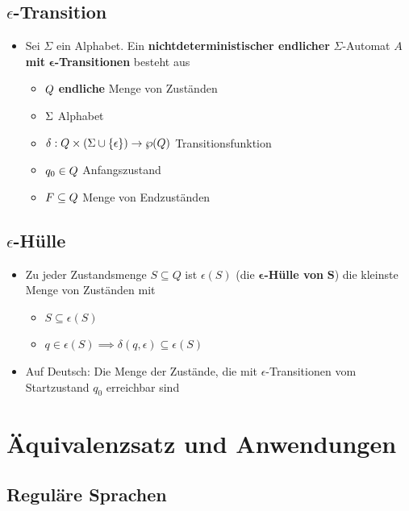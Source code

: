 \documentclass{scrartcl}
\begin{document}
\subsection{$\epsilon$-Transition}

\begin{itemize}
	\item Sei $\Sigma$ ein Alphabet. Ein \textbf{nichtdeterministischer endlicher} $\Sigma$-Automat $A$ \textbf{mit} $\mathbf{\epsilon}$\textbf{-Transitionen} besteht aus
	\begin{itemize}
		\item $Q \hfill$ \textbf{endliche} Menge von Zuständen
		\item $\Sigma \hfill$ Alphabet
		\item $\delta: Q \times (\Sigma \cup \{ \epsilon \}) \rightarrow \wp(Q) \hfill$ Transitionsfunktion
		\item $q_0 \in Q \hfill$ Anfangszustand
		\item $F \subseteq Q \hfill$ Menge von Endzuständen
	\end{itemize}
\end{itemize}

\subsection{$\epsilon$-Hülle}

\begin{itemize}
	\item Zu jeder Zustandsmenge $S \subseteq Q$ ist $\epsilon(S)$ (die $\mathbf{\epsilon}$\textbf{-Hülle von} $\mathbf{S}$) die kleinste Menge von Zuständen mit
	\begin{itemize}
		\item $S \subseteq \epsilon(S)$
		\item $q \in \epsilon(S) \implies \delta(q,\epsilon) \subseteq \epsilon(S)$
	\end{itemize}
	\item Auf Deutsch: Die Menge der Zustände, die mit $\epsilon$-Transitionen vom Startzustand $q_0$ erreichbar sind
\end{itemize}

\pagebreak
\section{Äquivalenzsatz und Anwendungen}

\subsection{Reguläre Sprachen}
\end{document}

